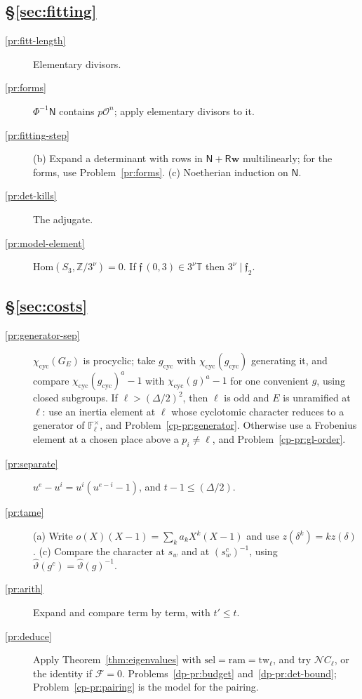 \documentclass[reqno]{amsart}
\theoremstyle{definition}
\theoremstyle{plain}
\newcommand{\Z}{\mathbb{Z}}
\newcommand{\F}{\mathbb{F}}
\newcommand{\Oc}{\mathcal{O}}
\newcommand{\cyc}{\chi_{\mathrm{cyc}}}
\newcommand{\Tb}{\mathbb{T}}
\newcommand{\half}{(\Delta/2)}
\begin{document}
\subsection*{\S\ref{sec:fitting}}
\begin{description}
\item[\ref{pr:fitt-length}] Elementary divisors.
\item[\ref{pr:forms}] \(\Phi^{-1}\mathsf N\) contains \(p\Oc^n\); apply elementary divisors to it.
\item[\ref{pr:fitting-step}] (b) Expand a determinant with rows in \(\mathsf N + \mathsf R\mathbf w\) multilinearly; for the forms, use Problem~\ref{pr:forms}.  (c) Noetherian induction on \(\mathsf N\).
\item[\ref{pr:det-kills}] The adjugate.
\item[\ref{pr:model-element}] \(\mathrm{Hom}(S_3, \Z/3^\nu) = 0\).  If \(\mathfrak f\,(0, 3) \in 3^\nu\Tb\) then \(3^\nu \mid \mathfrak f_2\).
\end{description}

\subsection*{\S\ref{sec:costs}}
\begin{description}
\item[\ref{pr:generator-sep}] \(\cyc(G_E)\) is procyclic; take \(g_{\mathrm{cyc}}\) with \(\cyc(g_{\mathrm{cyc}})\) generating it, and compare \(\cyc(g_{\mathrm{cyc}})^a - 1\) with \(\cyc(g)^a - 1\) for one convenient \(g\), using closed subgroups.  If \(\ell > \half^2\), then \(\ell\) is odd and \(E\) is unramified at \(\ell\): use an inertia element at \(\ell\) whose cyclotomic character reduces to a generator of \(\F_\ell^\times\), and Problem~\ref{cp-pr:generator}.  Otherwise use a Frobenius element at a chosen place above a \(p_i \ne \ell\), and Problem~\ref{cp-pr:gl-order}.
\item[\ref{pr:separate}] \(u^e - u^i = u^i(u^{e-i} - 1)\), and \(t - 1 \le \half\).
\item[\ref{pr:tame}] (a) Write \(o(X)(X - 1) = \sum_k a_kX^k(X - 1)\) and use \(z(\delta^k) = kz(\delta)\).  (c) Compare the character at \(s_w\) and at \((s_w^c)^{-1}\), using \(\hat\vartheta(g^c) = \hat\vartheta(g)^{-1}\).
\item[\ref{pr:arith}] Expand and compare term by term, with \(t' \le t\).
\item[\ref{pr:deduce}] Apply Theorem~\ref{thm:eigenvalues} with \(\mathrm{sel} = \mathrm{ram} = \mathrm{tw}_\ell\), and try \(\mathcal N C_\ell\), or the identity if \(\mathcal F = 0\).  Problems~\ref{dp-pr:budget} and~\ref{dp-pr:det-bound}; Problem~\ref{cp-pr:pairing} is the model for the pairing.
\end{description}
\end{document}
